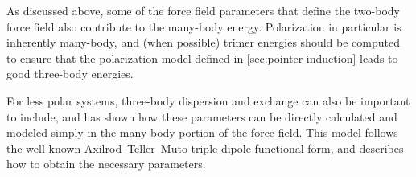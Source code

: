 As discussed above, some of the force field parameters that define the
two-body force field also contribute to the many-body energy. Polarization in
particular is inherently many-body, and (when possible) trimer energies should
be computed to ensure that the polarization model defined in
\cref{sec:pointer-induction} leads to good three-body energies.

For less polar systems, three-body dispersion and exchange can also be
important to include, and \citeauthor{McDaniel2014} has shown how these
parameters can be directly calculated and modeled simply in the many-body
portion of the force field.\cite{McDaniel2014} This model follows the
well-known Axilrod--Teller--Muto triple dipole functional form, and
 describes how to obtain the necessary parameters. 
